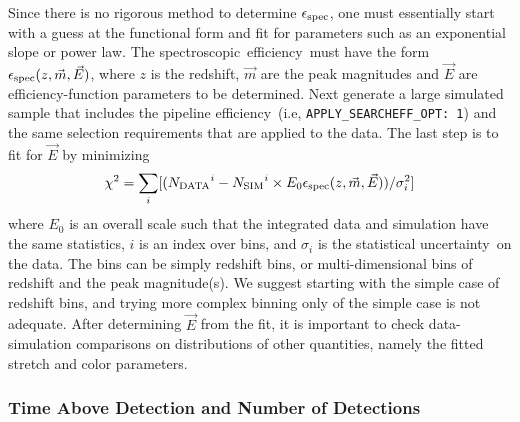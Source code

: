 \documentclass[12pt]{article}
\newcommand{\unc}{uncertainty}
\newcommand{\eff}{efficiency}
\newcommand{\simeffspec}{\epsilon_{\rm spec}}
\newcommand{\spec}{spectroscopic}
\begin{document}
{\newcommand{\Ndata}{N_{\rm DATA}}
\newcommand{\Nsim}{N_{\rm SIM}}

Since there is no rigorous method to determine $\simeffspec$,
one must essentially start with a guess at the functional 
form and fit for parameters such as an exponential slope or power law.
The \spec\ \eff\ must have the form
$\simeffspec(z,\vec{m},\vec{E})$, where 
$z$ is the redshift, $\vec{m}$ are the peak magnitudes and 
$\vec{E}$ are \eff-function parameters
to be determined. Next generate a large simulated
sample that includes the pipeline \eff\
(i.e, {\tt APPLY\_SEARCHEFF\_OPT: 1}) and the same
selection requirements that are applied to the data.
The last step is to fit for $\vec{E}$ by minimizing
\begin{equation}
   \chi^2 = \sum_i  
  [( {\Ndata}^i - 
   {\Nsim}^i \times E_0\simeffspec(z,\vec{m},\vec{E}) )/\sigma_i^2 ]
\end{equation}
% 
where $E_0$ is an overall scale such that
the integrated data and simulation have the same
statistics, $i$ is an index over bins,
and $\sigma_i$ is the statistical \unc\ on the data.
The bins can be simply redshift bins, 
or multi-dimensional bins of redshift and the peak magnitude(s).
We suggest starting with the simple case of redshift bins,
and trying more complex binning only of the simple case
is not adequate. After determining $\vec{E}$ from the fit,
it is important to check data-simulation comparisons
on distributions of other quantities, namely the
fitted stretch and color parameters.


   \clearpage
   \subsubsection{Time Above Detection and Number of Detections}
   \label{sssec:detect_var}

}
\end{document}

